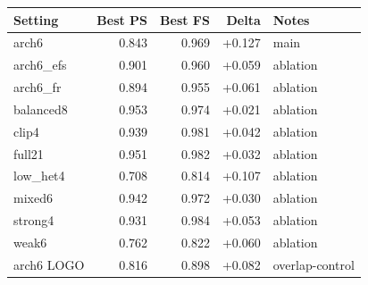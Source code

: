 \begin{tabular}{lrrrl}
\toprule
Setting & Best PS & Best FS & Delta & Notes \\
\midrule
arch6 & 0.843 & 0.969 & +0.127 & main \\
arch6\_efs & 0.901 & 0.960 & +0.059 & ablation \\
arch6\_fr & 0.894 & 0.955 & +0.061 & ablation \\
balanced8 & 0.953 & 0.974 & +0.021 & ablation \\
clip4 & 0.939 & 0.981 & +0.042 & ablation \\
full21 & 0.951 & 0.982 & +0.032 & ablation \\
low\_het4 & 0.708 & 0.814 & +0.107 & ablation \\
mixed6 & 0.942 & 0.972 & +0.030 & ablation \\
strong4 & 0.931 & 0.984 & +0.053 & ablation \\
weak6 & 0.762 & 0.822 & +0.060 & ablation \\
arch6 LOGO & 0.816 & 0.898 & +0.082 & overlap-control \\
\bottomrule
\end{tabular}